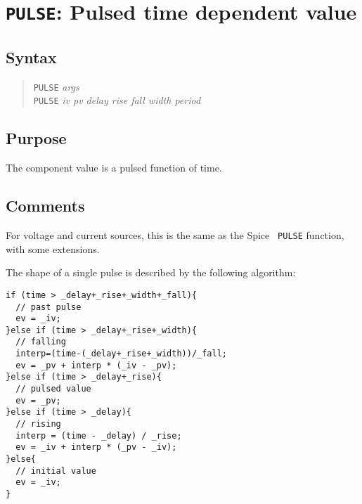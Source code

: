 %
%
%
%
\section{{\tt PULSE}: Pulsed time dependent value}
\subsection{Syntax}
\begin{verse}
{\tt PULSE} {\it args}\\
{\tt PULSE} {\it iv pv delay rise fall width period}
\end{verse}
\subsection{Purpose}

The component value is a pulsed function of time.
\subsection{Comments}

For voltage and current sources, this is the same as the Spice {\tt
PULSE} function, with some extensions.

The shape of a single pulse is described by the following algorithm:

\begin{verbatim}
if (time > _delay+_rise+_width+_fall){
  // past pulse
  ev = _iv;
}else if (time > _delay+_rise+_width){
  // falling
  interp=(time-(_delay+_rise+_width))/_fall;
  ev = _pv + interp * (_iv - _pv);
}else if (time > _delay+_rise){
  // pulsed value
  ev = _pv;
}else if (time > _delay){
  // rising
  interp = (time - _delay) / _rise;
  ev = _iv + interp * (_pv - _iv);
}else{
  // initial value
  ev = _iv;
}
\end{verbatim}
